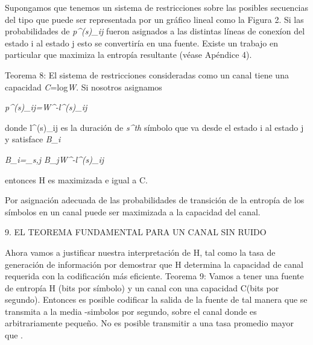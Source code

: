 Supongamos que tenemos un sistema de restricciones sobre las posibles secuencias del tipo que puede ser 
representada por un gr\'afico lineal como la Figura 2. Si las probabilidades de \textit{p^{(s)}_{ij}} fueron 
asignados a las distintas l\'ineas de conex\'ion del estado i al estado j esto se convertir\'ia en una fuente. 
Existe un trabajo en particular que maximiza la entrop\'ia resultante (v\'ease Ap\'endice 4).

Teorema 8: El sistema de restricciones consideradas como un canal tiene una capacidad \textit{C}=log\textit{W}.
Si nosotros asignamos
\begin{center}
\textit{p^{(s)}_{ij}=W^{-l^{(s)}_{ij}} } 
\end{center}
donde l^{(s)_{ij}} es la duraci\'on de \textit{s^{th}} s\'imbolo que va desde el estado i al estado j y satisface 
\textit{B_{i}}

\begin{center}
\textit{B_{i}=\Sigma_{s,j} B_{j}W^{-l^{(s)}_{ij}}}
\end{center}
entonces H es maximizada e igual a C.

Por asignaci\'on adecuada de las probabilidades de transici\'on de la entrop\'ia de los s\'imbolos en un canal 
puede ser maximizada a la capacidad del canal.

\begin{center}
9. EL TEOREMA FUNDAMENTAL PARA UN CANAL SIN RUIDO
\end{center}

Ahora vamos a justificar nuestra interpretaci\'on de H, tal como la tasa de generaci\'on de informaci\'on por 
demostrar que H determina la capacidad de canal requerida con la codificaci\'on m\'as eficiente.
Teorema 9: Vamos a tener una fuente de entrop\'ia H (bits por s\'imbolo) y un canal con una capacidad C(bits por 
segundo). Entonces es posible codificar la salida de la fuente de tal manera que se transmita a la media 
-\epsilon simbolos por segundo, sobre el canal donde es arbitrariamente peque\~{n}o. No es posible 
transmitir a una tasa promedio mayor que .\\



